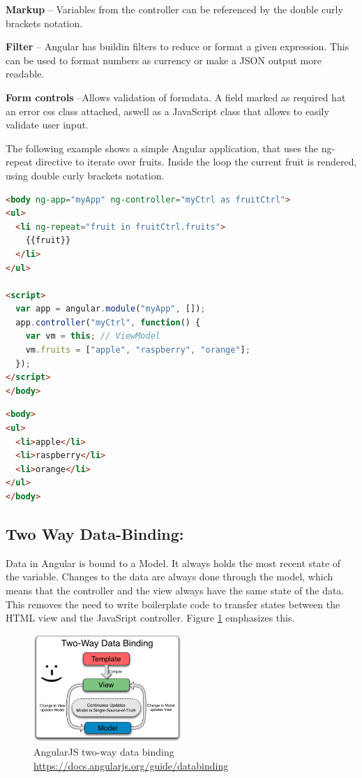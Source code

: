 \noindent\textbf{Markup} -- Variables from the controller can be referenced by the double curly brackets notation.

\noindent\textbf{Filter} -- Angular has buildin filters to reduce or format a given expression. This can be used to format numbers as currency or make a JSON output more readable.

\noindent\textbf{Form controls} --Allows validation of formdata. A field marked as required hat an error css class attached, aswell as a JavaScript class that allows to easily validate user input.\vspace{1ex}

The following example shows a simple Angular application, that uses the ng-repeat directive to iterate over fruits. Inside the loop the current fruit is rendered, using double curly brackets notation.

\begin{lstlisting}[language=html, caption=ng-repeat Angular fruit example, label=lst:angular]
<body ng-app="myApp" ng-controller="myCtrl as fruitCtrl">
<ul>
  <li ng-repeat="fruit in fruitCtrl.fruits">
    {{fruit}}
  </li>
</ul>

<script>
  var app = angular.module("myApp", []);
  app.controller("myCtrl", function() {
    var vm = this; // ViewModel
    vm.fruits = ["apple", "raspberry", "orange"];
  });
</script>
</body>
\end{lstlisting}

\begin{lstlisting}[language=html, caption=ng-repeat Fruit result]
<body>
<ul>
  <li>apple</li>
  <li>raspberry</li>
  <li>orange</li>
</ul>
</body>
\end{lstlisting}


\subsection{Two Way Data-Binding:}
\label{sec:tw-binding}
Data in Angular is bound to a Model. It always holds the most recent state of the variable. Changes to the data are always done through the model, which means that the controller and the view always have the same state of the data. This removes the need to write boilerplate code to transfer states between the HTML view and the JavaSript controller. Figure \ref{fig:tw-databinding} emphasizes this.

\begin{figure}[H]
	\centering\includegraphics[width=0.5\textwidth]{res/Two_Way_Data_Binding}
	\caption{AngularJS two-way data binding \url{https://docs.angularjs.org/guide/databinding}}
	\label{fig:tw-databinding}
\end{figure}


